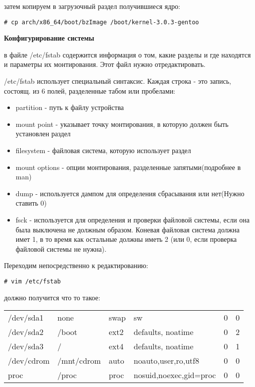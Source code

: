 \documentclass[12pt, a4paper]{article}
\begin{document}
затем копируем в загрузочный раздел получившиеся ядро:

\begin{verbatim}
# cp arch/x86_64/boot/bzImage /boot/kernel-3.0.3-gentoo
\end{verbatim}

{\bf Конфигурирование системы}

в файле /etc/fstab  содержится информация о том, какие разделы и где находятся и параметры их монтирования. Этот файл нужно отредактировать.

/etc/fstab использует специальный синтаксис. Каждая строка - это запись, состоящ. из 6 полей, разделенные табом или пробелами:
\begin{itemize}
\item partition - путь к файлу устройства
\item mount point - указывает точку монтирования, в которую должен быть установлен раздел
\item filesystem - файловая система, которую использует раздел
\item mount options - опции монтирования, разделенные запятыми(подробнее в man)
\item dump - используется дампом для определения сбрасывания или нет(Нужно ставить 0)
\item fsck - используется для определения и проверки файловой системы, если она была выключена не должным образом. Коневая файловая система должна имет 1, в то время как остальные должны иметь 2 (или 0, если проверка файловой системы не нужна).
\end{itemize}

Переходим непосредственно к редактированию:

\begin{verbatim}
# vim /etc/fstab
\end{verbatim}

должно получится что то такое:
\newline

\begin{tabular}{llllcc}
/dev/sda1 & none & swap & sw & 0 & 0 \\
/dev/sda2 & /boot & ext2 & defaults, noatime & 0 & 2\\
/dev/sda3 & / & ext4 & defaults, noatime & 0 & 1 \\
/dev/cdrom& /mnt/cdrom & auto & noauto,user,ro,utf8 & 0 & 0 \\
proc & /proc & proc & nosuid,noexec,gid=proc & 0 & 0 \\
\end{tabular}
\end{document}
